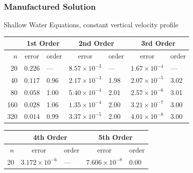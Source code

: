\documentclass[10pt]{beamer}
\begin{document}
\begin{frame}
  \frametitle{Manufactured Solution}
  Shallow Water Equations, constant vertical velocity profile
  \footnotesize
  \begin{table}
    \centering
    \begin{tabular}{r*{6}l}
      \toprule
            & \multicolumn{2}{c}{1st Order} & \multicolumn{2}{c}{2nd Order} & \multicolumn{2}{c}{3rd Order}                                             \\
      \midrule
      \(n\) & \multicolumn{1}{c}{error}     & order                         & \multicolumn{1}{c}{error}     & order & \multicolumn{1}{c}{error} & order \\
      \midrule
      20    & \( 0.226 \)                   & ---                           & \( 8.57 \times 10^{-3} \)     & ---   & \( 1.67 \times 10^{-4} \) & ---   \\
      40    & \( 0.117 \)                   & 0.96                          & \( 2.17 \times 10^{-3} \)     & 1.98  & \( 2.07 \times 10^{-5} \) & 3.02  \\
      80    & \( 0.058 \)                   & 1.00                          & \( 5.40 \times 10^{-4} \)     & 2.01  & \( 2.57 \times 10^{-6} \) & 3.01  \\
      160   & \( 0.028 \)                   & 1.06                          & \( 1.35 \times 10^{-4} \)     & 2.00  & \( 3.21 \times 10^{-7} \) & 3.00  \\
      320   & \( 0.014 \)                   & 0.99                          & \( 3.37 \times 10^{-5} \)     & 2.00  & \( 4.01 \times 10^{-8} \) & 3.00  \\
      \bottomrule
    \end{tabular}
  \end{table}
  \begin{table}
    \centering
    \begin{tabular}{r*{4}l}
      \toprule
            & \multicolumn{2}{c}{4th Order} & \multicolumn{2}{c}{5th Order}                                       \\
      \midrule
      \(n\) & \multicolumn{1}{c}{error}     & order                         & \multicolumn{1}{c}{error}   & order \\
      \midrule
      20    & \( 3.172 \times 10^{-6}  \)   & ---                           & \( 7.606 \times 10^{-8}  \) & 0.00  \\

\end{tabular}
\end{table}
\end{frame}
\end{document}
